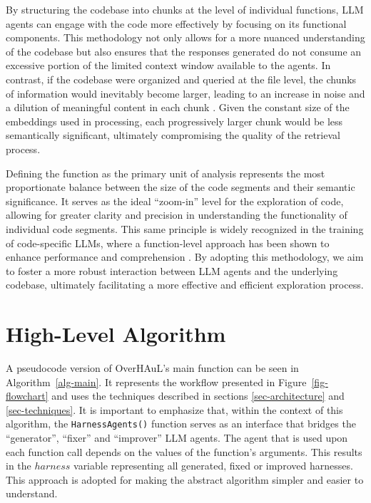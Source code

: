 \documentclass[
  a4paper,
  DIV=11,
  numbers=noendperiod]{scrreprt}
\theoremstyle{definition}
\theoremstyle{remark}
\begin{document}
By structuring the codebase into chunks at the level of individual
functions, LLM agents can engage with the code more effectively by
focusing on its functional components. This methodology not only allows
for a more nuanced understanding of the codebase but also ensures that
the responses generated do not consume an excessive portion of the
limited context window available to the agents. In contrast, if the
codebase were organized and queried at the file level, the chunks of
information would inevitably become larger, leading to an increase in
noise and a dilution of meaningful content in each chunk
\autocite{zhao2024}. Given the constant size of the embeddings used in
processing, each progressively larger chunk would be less semantically
significant, ultimately compromising the quality of the retrieval
process.

Defining the function as the primary unit of analysis represents the
most proportionate balance between the size of the code segments and
their semantic significance. It serves as the ideal ``zoom-in'' level
for the exploration of code, allowing for greater clarity and precision
in understanding the functionality of individual code segments. This
same principle is widely recognized in the training of code-specific
LLMs, where a function-level approach has been shown to enhance
performance and comprehension \autocite{chen2021}. By adopting this
methodology, we aim to foster a more robust interaction between LLM
agents and the underlying codebase, ultimately facilitating a more
effective and efficient exploration process.

\section{High-Level Algorithm}\label{high-level-algorithm}

A pseudocode version of OverHAuL's main function can be seen in
Algorithm~\ref{alg-main}. It represents the workflow presented in
Figure~\ref{fig-flowchart} and uses the techniques described in sections
\ref{sec-architecture} and \ref{sec-techniques}. It is important to
emphasize that, within the context of this algorithm, the
\texttt{HarnessAgents()} function serves as an interface that bridges
the ``generator'', ``fixer'' and ``improver'' LLM agents. The agent that
is used upon each function call depends on the values of the function's
arguments. This results in the \(harness\) variable representing all
generated, fixed or improved harnesses. This approach is adopted for
making the abstract algorithm simpler and easier to understand.
\end{document}

